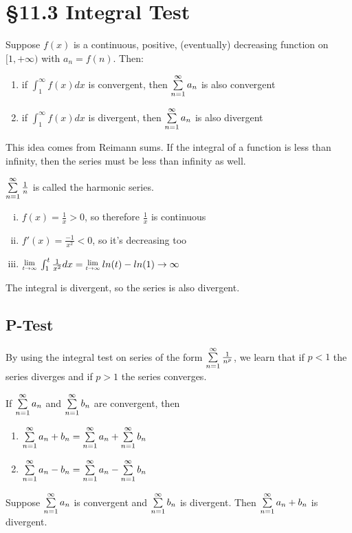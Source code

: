 \documentclass[12 pt]{article}
\begin{document}
	\section{\S 11.3 Integral Test}
		Suppose $f(x)$ is a continuous, positive, (eventually) decreasing function on $[1,+\infty)$ with $a_n=f(n)$. Then:
		\begin{enumerate}[i]
			\item if $\int_{1}^{\infty}f(x)dx$ is convergent, then $\sum\limits_{n=1}^{\infty} a_n$ is also convergent
			\item if $\int_{1}^{\infty}f(x)dx$ is divergent, then $\sum\limits_{n=1}^{\infty} a_n$ is also divergent
		\end{enumerate}
		This idea comes from Reimann sums. If the integral of a function is less than infinity, then the series must be less than infinity as well.
		\begin{exmp*}
			$\sum\limits_{n=1}^{\infty} \frac{1}{n}$ is called the harmonic series.\\
			\begin{enumerate}[i)]
				\item $f(x)=\frac{1}{x}>0$, so therefore $\frac{1}{x}$ is continuous
				\item $f'(x)=\frac{-1}{x^2}<0$, so it's decreasing too
				\item $\Lim{t\toinfty}\int_1^t\frac{1}{x^2}dx=\Lim{t\toinfty}ln(t)-ln(1)\rightarrow\infty$
			\end{enumerate}
			The integral is divergent, so the series is also divergent.
		\end{exmp*}

		\subsection{P-Test}

		By using the integral test on series of the form $\sum\limits_{n=1}^{\infty} \frac{1}{n^p}$, we learn that if $p<1$ the series diverges and if $p>1$ the series converges.
		\begin{remark}
			If $\sum\limits_{n=1}^{\infty} a_n$ and $\sum\limits_{n=1}^{\infty} b_n$ are convergent, then
			\begin{enumerate}[i]
				\item $\sum\limits_{n=1}^{\infty} a_n+b_n=\sum\limits_{n=1}^{\infty} a_n+\sum\limits_{n=1}^{\infty} b_n$
				\item $\sum\limits_{n=1}^{\infty} a_n-b_n=\sum\limits_{n=1}^{\infty} a_n-\sum\limits_{n=1}^{\infty} b_n$
			\end{enumerate}
		\end{remark}
		\begin{remark}
			Suppose $\sum\limits_{n=1}^{\infty} a_n$ is convergent and $\sum\limits_{n=1}^{\infty} b_n$ is divergent. Then $\sum\limits_{n=1}^{\infty} a_n+b_n$ is divergent.
		\end{remark}
\end{document}
